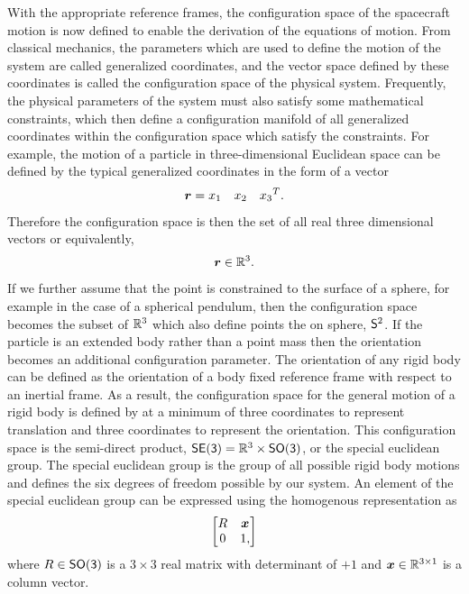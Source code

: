 With the appropriate reference frames, the configuration space of the spacecraft motion is now defined to enable the derivation of the equations of motion.
From classical mechanics, the parameters which are used to define the motion of the system are called generalized coordinates, and the vector space defined by these coordinates is called the configuration space of the physical system.
Frequently, the physical parameters of the system must also satisfy some mathematical constraints, which then define a configuration manifold of all generalized coordinates within the configuration space which satisfy the constraints.
For example, the motion of a particle in three-dimensional Euclidean space can be defined by the typical generalized coordinates in the form of a vector
\begin{align*}
    \vb{r} = \begin{matrix}
        x_1 & x_2 & x_3
    \end{matrix}^T.
\end{align*}
Therefore the configuration space is then the set of all real three dimensional vectors or equivalently,
\begin{align*}
    \vb{r} \in \R^3.
\end{align*}
If we further assume that the point is constrained to the surface of a sphere, for example in the case of a spherical pendulum, then the configuration space becomes the subset of \( \R^3 \) which also define points the on sphere, \( \S^2 \).
If the particle is an extended body rather than a point mass then the orientation becomes an additional configuration parameter.
The orientation of any rigid body can be defined as the orientation of a body fixed reference frame with respect to an inertial frame. 
As a result, the configuration space for the general motion of a rigid body is defined by at a minimum of three coordinates to represent translation and three coordinates to represent the orientation.
This configuration space is the semi-direct product, \(\SE = \R^3 \times \SO \), or the special euclidean group.
The special euclidean group is the group of all possible rigid body motions and defines the six degrees of freedom possible by our system.
An element of the special euclidean group can be expressed using the homogenous representation as
\begin{align*}
    \begin{bmatrix}
        R & \vb{x} \\
        0 & 1,
    \end{bmatrix}
\end{align*}
where \( R \in \SO\) is a \( 3 \times 3 \) real matrix with determinant of \( +1\) and \( \vb{x} \in \R^{3 \times 1}\) is a column vector.

